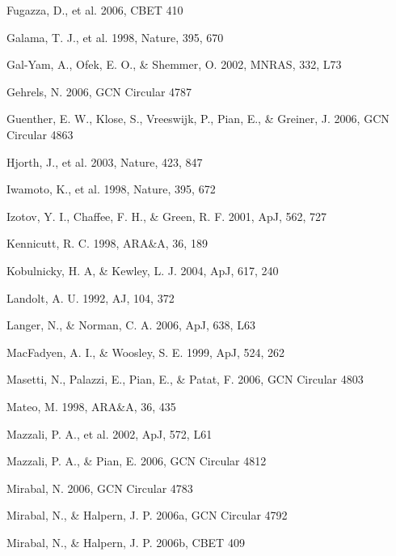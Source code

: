 \documentclass[apj]{emulateapj}
\begin{document}
\begin{thebibliography}{99}
 Fugazza, D., et al. 2006, CBET 410

 Galama, T. J., et al. 1998, Nature, 
395, 670

Gal-Yam, A., Ofek, E. O., \& Shemmer,
O. 2002, MNRAS, 332, L73

 Gehrels, N. 2006, GCN Circular 4787


 Guenther, E. W., Klose, S., Vreeswijk, P.,
Pian, E., \& Greiner, J. 2006, GCN Circular 4863

 Hjorth, J., et al. 2003, Nature, 
423, 847

 Iwamoto, K., et al. 1998, Nature,
395, 672

 Izotov, Y. I., Chaffee, F. H.,
\& Green, R. F. 2001, ApJ, 562, 727

 Kennicutt, R. C. 1998, ARA\&A, 36, 189

 Kobulnicky, H. A, \& Kewley,
L. J. 2004, ApJ, 617, 240

 Landolt, A. U. 1992, AJ, 104, 372

 Langer, N., \& Norman, C. A. 2006,
ApJ, 638, L63

 MacFadyen, A. I., \& Woosley, S. E. 1999, ApJ, 524, 262

 Masetti, N., Palazzi, E., Pian, E.,
\& Patat, F. 2006, GCN Circular 4803

 Mateo, M. 1998, ARA\&A, 36, 435

 Mazzali, P. A., et al. 2002, 
ApJ, 572, L61 

 Mazzali, P. A., \& 
Pian, E. 2006, GCN Circular 4812


 Mirabal, N. 2006, GCN Circular 4783

 Mirabal, N., \& Halpern, J. P. 2006a, GCN Circular 4792


 Mirabal, N., \& Halpern, J. P. 2006b, CBET
409


\end{thebibliography}
\end{document}
